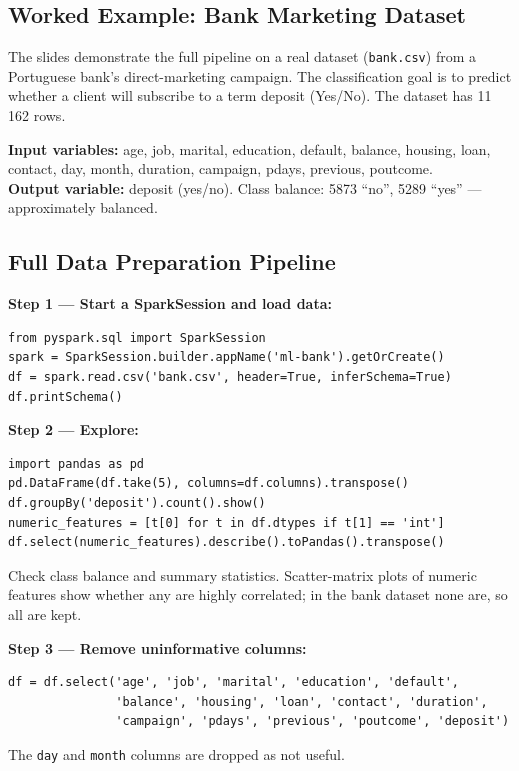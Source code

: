 \documentclass[11pt]{article}
\begin{document}
\subsection{Worked Example: Bank Marketing Dataset}
The slides demonstrate the full pipeline on a real dataset (\texttt{bank.csv}) from a Portuguese bank's direct-marketing campaign. The classification goal is to predict whether a client will subscribe to a term deposit (Yes/No). The dataset has 11\,162 rows.

\textbf{Input variables:} age, job, marital, education, default, balance, housing, loan, contact, day, month, duration, campaign, pdays, previous, poutcome.\\
\textbf{Output variable:} deposit (yes/no). Class balance: 5873 ``no'', 5289 ``yes'' --- approximately balanced.

\subsection{Full Data Preparation Pipeline}

\textbf{Step 1 --- Start a SparkSession and load data:}
\begin{verbatim}
from pyspark.sql import SparkSession
spark = SparkSession.builder.appName('ml-bank').getOrCreate()
df = spark.read.csv('bank.csv', header=True, inferSchema=True)
df.printSchema()
\end{verbatim}

\textbf{Step 2 --- Explore:}
\begin{verbatim}
import pandas as pd
pd.DataFrame(df.take(5), columns=df.columns).transpose()
df.groupBy('deposit').count().show()
numeric_features = [t[0] for t in df.dtypes if t[1] == 'int']
df.select(numeric_features).describe().toPandas().transpose()
\end{verbatim}
Check class balance and summary statistics. Scatter-matrix plots of numeric features show whether any are highly correlated; in the bank dataset none are, so all are kept.

\textbf{Step 3 --- Remove uninformative columns:}
\begin{verbatim}
df = df.select('age', 'job', 'marital', 'education', 'default',
               'balance', 'housing', 'loan', 'contact', 'duration',
               'campaign', 'pdays', 'previous', 'poutcome', 'deposit')
\end{verbatim}
The \texttt{day} and \texttt{month} columns are dropped as not useful.
\end{document}
